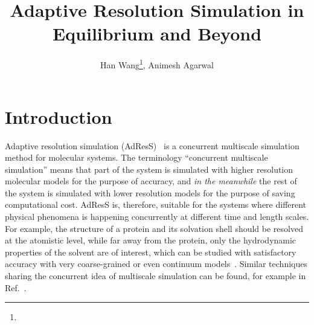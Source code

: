 \documentclass[epjST]{svjour}
\begin{document}
%
\title{Adaptive Resolution Simulation in Equilibrium and Beyond}
\author{Han Wang\fnmsep\thanks{}, Animesh Agarwal}
%
%
%
\maketitle
%

\section{Introduction}

Adaptive resolution simulation (AdResS)~\cite{praprotnik2005adaptive,praprotnik2006adaptive,praprotnik2007adaptive,praprotnik2008multiscale,poma2010classical,poblete2010coupling,praprotnik2011statistical,fritsch2012adaptive,bevc2013adaptive} is a concurrent multiscale simulation method for molecular systems.
The terminology ``concurrent multiscale simulation'' means that
part of the system is simulated with higher resolution molecular models for the
purpose of accuracy, and \emph{in the meanwhile} the rest of the system is
simulated with lower resolution models for the purpose of saving computational cost.
AdResS is, therefore, suitable for the systems where different physical
phenomena is happening concurrently at different time and length scales. For example,
the structure of a protein and its solvation shell
should be resolved at the atomistic level, while far away from the protein,
only the hydrodynamic properties of the solvent are of interest, which can be studied with satisfactory
accuracy with very coarse-grained or even continuum
models~\cite{zavadlav2014adaptive,zavadlav2014adaptive1,delgado2009coupling}.
Similar  
techniques sharing the concurrent idea of multiscale simulation can be found, for example in Ref.~\cite{ensing2007energy,heyes2010thermodynamic,shi2006mixed,shen2014resolution,nielsen2010adaptive}.
\end{document}
